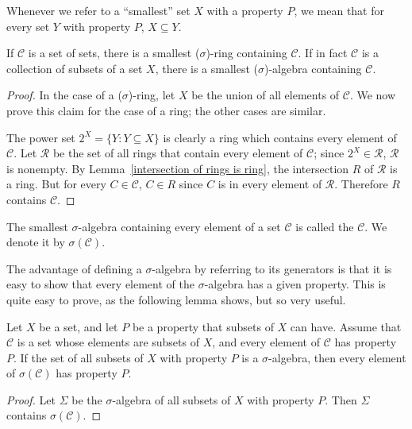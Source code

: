 \begin{subsec}
Whenever we refer to a ``smallest'' set $X$ with a property $P$, we mean that for every set $Y$ with property $P$, $X \subseteq Y$.
\end{subsec}

\begin{lemma}
If $\mathcal C$ is a set of sets, there is a smallest ($\sigma$)-ring containing $\mathcal C$. If in fact $\mathcal C$ is a collection of subsets of a set $X$, there is a smallest ($\sigma$)-algebra containing $\mathcal C$.
\end{lemma}
\begin{proof}
In the case of a ($\sigma$)-ring, let $X$ be the union of all elements of $\mathcal C$.
We now prove this claim for the case of a ring; the other cases are similar.

The power set $2^{X} = \{Y: Y \subseteq X\}$ is clearly a ring which contains every element of $\mathcal C$.
Let $\mathcal R$ be the set of all rings that contain every element of $\mathcal C$; since $2^{X} \in \mathcal R$, $\mathcal R$ is nonempty.
By Lemma~\ref{intersection of rings is ring}, the intersection $R$ of $\mathcal R$ is a ring.
But for every $C \in \mathcal C$, $C \in R$ since $C$ is in every element of $\mathcal R$.
Therefore $R$ contains $\mathcal C$.
\end{proof}

\begin{definition}
The smallest $\sigma$-algebra containing every element of a set $\mathcal C$ is called the  $\mathcal C$.
We denote it by $\sigma(\mathcal C)$.
\end{definition}

\begin{subsec}
The advantage of defining a $\sigma$-algebra by referring to its generators is that it is easy to show that every element of the $\sigma$-algebra has a given property.
This is quite easy to prove, as the following lemma shows, but so very useful.
\end{subsec}

\begin{lemma}
\label{generators and relations}
Let $X$ be a set, and let $P$ be a property that subsets of $X$ can have.
Assume that $\mathcal C$ is a set whose elements are subsets of $X$, and every element of $\mathcal C$ has property $P$.
If the set of all subsets of $X$ with property $P$ is a $\sigma$-algebra, then every element of $\sigma(\mathcal C)$ has property $P$.
\end{lemma}
\begin{proof}
Let $\Sigma$ be the $\sigma$-algebra of all subsets of $X$ with property $P$.
Then $\Sigma$ contains $\sigma(\mathcal C)$.
\end{proof}

